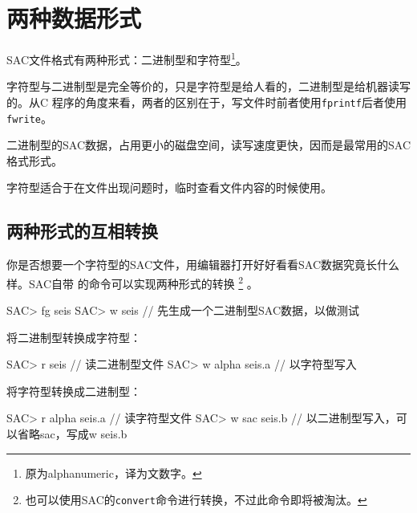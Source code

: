 \section{两种数据形式}
SAC文件格式有两种形式：二进制型和字符型\footnote{原为alphanumeric，译为文数字。}。

字符型与二进制型是完全等价的，只是字符型是给人看的，二进制型是给机器读写的。从C
程序的角度来看，两者的区别在于，写文件时前者使用\lstinline{fprintf}后者使用
\lstinline{fwrite}。

二进制型的SAC数据，占用更小的磁盘空间，读写速度更快，因而是最常用的SAC格式形式。

字符型适合于在文件出现问题时，临时查看文件内容的时候使用。

\subsection{两种形式的互相转换}
你是否想要一个字符型的SAC文件，用编辑器打开好好看看SAC数据究竟长什么样。SAC自带
的命令可以实现两种形式的转换
\footnote{也可以使用SAC的\lstinline{convert}命令进行转换，不过此命令即将被淘汰。}
。
\begin{SACCode}
SAC> fg seis
SAC> w seis             // 先生成一个二进制型SAC数据，以做测试
\end{SACCode}

将二进制型转换成字符型：
\begin{SACCode}
SAC> r seis             // 读二进制型文件
SAC> w alpha seis.a     // 以字符型写入
\end{SACCode}

将字符型转换成二进制型：
\begin{SACCode}
SAC> r alpha seis.a     // 读字符型文件
SAC> w sac seis.b       // 以二进制型写入，可以省略sac，写成w seis.b
\end{SACCode}

